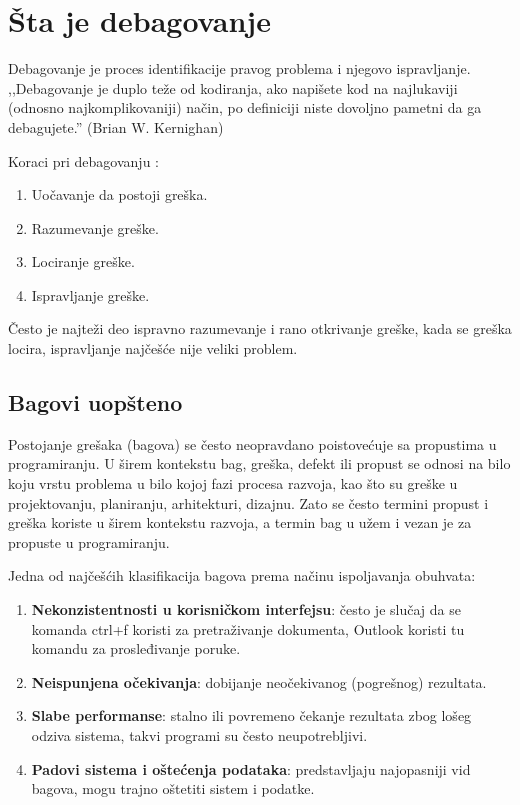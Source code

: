 \documentclass[a4paper]{article}
\begin{document}
\section{Šta je debagovanje}
\label{sec:sta je debagovanje}

Debagovanje je proces identifikacije pravog problema i njegovo ispravljanje.
,,Debagovanje je duplo teže od kodiranja, ako napišete kod na najlukaviji
(odnosno najkomplikovaniji) način, po definiciji niste dovoljno pametni da ga
debagujete.'' (Brian W. Kernighan) \cite{debagovanje_vladaf}


Koraci pri debagovanju \cite{bagovi_smalkov}:
\begin{enumerate}
\item Uočavanje da postoji greška.
\item Razumevanje greške.
\item Lociranje greške.
\item Ispravljanje greške.
\end{enumerate}

Često je najteži deo ispravno razumevanje i rano otkrivanje greške, kada se greška locira, ispravljanje najčešće nije veliki problem.


\subsection{Bagovi uopšteno}
\label{subsec:podnaslov1}

Postojanje grešaka (bagova) se često neopravdano poistovećuje sa propustima u programiranju.  U širem kontekstu bag, greška, defekt ili propust se odnosi na bilo koju vrstu problema u bilo kojoj fazi procesa razvoja, kao što su greške u projektovanju, planiranju, arhitekturi, dizajnu. Zato se često termini propust i greška koriste u širem kontekstu razvoja, a termin bag u užem i vezan je za propuste u programiranju.

Jedna od najčešćih klasifikacija bagova prema načinu ispoljavanja obuhvata:
\begin{enumerate}
	\item \textbf{Nekonzistentnosti u korisničkom interfejsu}: često je slučaj da se komanda ctrl+f koristi za pretraživanje dokumenta, Outlook koristi   
	tu komandu za prosleđivanje poruke.
	\item \textbf{Neispunjena očekivanja}: dobijanje neočekivanog (pogrešnog) rezultata.
	\item \textbf{Slabe performanse}: stalno ili povremeno čekanje rezultata zbog lošeg odziva sistema, takvi programi su često neupotrebljivi.
	\item \textbf{Padovi sistema i oštećenja podataka}: predstavljaju najopasniji vid bagova, mogu trajno oštetiti sistem i podatke.
\end{enumerate}
\end{document}
